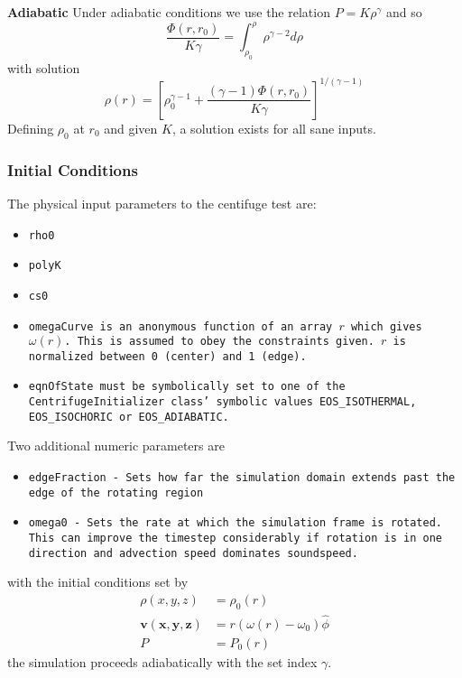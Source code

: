 \textbf{Adiabatic}
Under adiabatic conditions we use the relation $P = K \rho^\gamma$ and so
\[ \frac{\Phi(r,r_0)}{K \gamma} = \int_{\rho_0}^\rho \rho^{\gamma-2} d\rho \]
with solution
\[ \rho(r) = \left[ \rho_0^{\gamma-1} + \frac{(\gamma-1)\Phi(r,r_0)}{K \gamma} \right]^{1/(\gamma-1)} \]
Defining $\rho_0$ at $r_0$ and given $K$, a solution exists for all sane inputs.

\subsubsection{Initial Conditions}

The physical input parameters to the centifuge test are:
\begin{itemize}
\item \tt{rho0}
\item \tt{polyK}
\item \tt{cs0}
\item \tt{omegaCurve} is an anonymous function of an array $r$ which gives $\omega(r)$. This is assumed to obey the constraints given. $r$ is normalized between 0 (center) and 1 (edge).
\item \tt{eqnOfState} must be symbolically set to one of the \tt{CentrifugeInitializer} class' symbolic values \tt{EOS\_ISOTHERMAL}, \tt{EOS\_ISOCHORIC} or \tt{EOS\_ADIABATIC}.
\end{itemize}

Two additional numeric parameters are
\begin{itemize}
\item \tt{edgeFraction} - Sets how far the simulation domain extends past the edge of the
rotating region
\item \tt{omega0} - Sets the rate at which the simulation frame is rotated. This can improve the timestep considerably if rotation is in one direction and advection speed dominates soundspeed.
\end{itemize}

with the initial conditions set by
\begin{align*}
\rho(x,y,z) &= \rho_0(r) \\
\mathbf{v(x,y,z)} &= r (\omega(r) - \omega_0) \hat{\phi} \\
P &= P_0(r)
\end{align*}
the simulation proceeds adiabatically with the set index $\gamma$.

 
